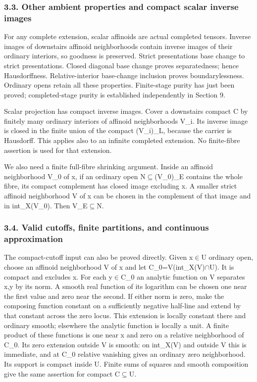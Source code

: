 \documentclass[
  10pt,
]{article}
\begin{document}
\subsubsection{3.3. Other ambient properties and compact scalar inverse
images}\label{other-ambient-properties-and-compact-scalar-inverse-images}

For any complete extension, scalar affinoids are actual completed
tensors. Inverse images of downstairs affinoid neighborhoods contain
inverse images of their ordinary interiors, so goodness is preserved.
Strict presentations base change to strict presentations. Closed
diagonal base change proves separatedness; hence Hausdorffness.
Relative-interior base-change inclusion proves boundarylessness.
Ordinary opens retain all these properties. Finite-stage purity has just
been proved; completed-stage purity is established independently in
Section 9.

Scalar projection has compact inverse images. Cover a downstairs compact
C by finitely many ordinary interiors of affinoid neighborhoods V\_i.
Its inverse image is closed in the finite union of the compact
(V\_i)\_L, because the carrier is Hausdorff. This applies also to an
infinite completed extension. No finite-fibre assertion is used for that
extension.

We also need a finite full-fibre shrinking argument. Inside an affinoid
neighborhood V\_0 of x, if an ordinary open N\ensuremath{\subseteq}(V\_0)\_E contains the
whole fibre, its compact complement has closed image excluding x. A
smaller strict affinoid neighborhood V of x can be chosen in the
complement of that image and in int\_X(V\_0). Then V\_E\ensuremath{\subseteq}N.

\subsubsection{3.4. Valid cutoffs, finite partitions, and continuous
approximation}\label{valid-cutoffs-finite-partitions-and-continuous-approximation}

The compact-cutoff input can also be proved directly. Given x\ensuremath{\in}U ordinary
open, choose an affinoid neighborhood V of x and let
C\_0=V(int\_X(V)\ensuremath{\cap}U). It is compact and excludes x. For each y\ensuremath{\in}C\_0 an
analytic function on V separates x,y by its norm. A smooth real function
of its logarithm can be chosen one near the first value and zero near
the second. If either norm is zero, make the composing function constant
on a sufficiently negative half-line and extend by that constant across
the zero locus. This extension is locally constant there and ordinary
smooth; elsewhere the analytic function is locally a unit. A finite
product of these functions is one near x and zero on a relative
neighborhood of C\_0. Its zero extension outside V is smooth: on
int\_X(V) and outside V this is immediate, and at C\_0 relative
vanishing gives an ordinary zero neighborhood. Its support is compact
inside U. Finite sums of squares and smooth composition give the same
assertion for compact C\ensuremath{\subseteq}U.
\end{document}
